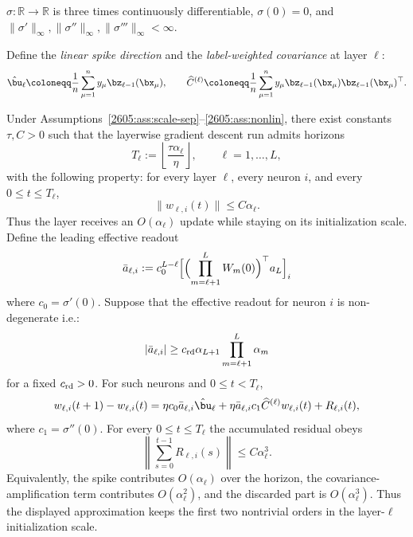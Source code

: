 \begin{assumption}\label{2605:ass:nonlin}
$\sigma:\mathbb{R}\to\mathbb{R}$ is three times continuously differentiable,
$\sigma(0)=0$, and $\|\sigma'\|_\infty,\|\sigma''\|_\infty,\|\sigma'''\|_\infty<\infty$.
\end{assumption}

Define the \emph{linear spike direction} and the \emph{label-weighted covariance} at layer $\ell$:
\begin{equation}\label{2605:eq:sec2-linear-component}
\hat{\bu}_\ell
\coloneqq \frac{1}{n}\sum_{\mu=1}^n y_\mu \bz_{\ell-1}(\bx_\mu),
\qquad
\widehat{C}^{(\ell)}
\coloneqq \frac{1}{n}\sum_{\mu=1}^n
y_\mu \bz_{\ell-1}(\bx_\mu)\bz_{\ell-1}(\bx_\mu)^\top.
\end{equation}

\begin{theorem}\label{2605:thm:neural-lofi}
Under Assumptions~\ref{2605:ass:scale-sep}--\ref{2605:ass:nonlin}, there exist constants
$\tau,C>0$ such that the layerwise gradient descent run admits
horizons
\begin{equation}\label{2605:eq:layerwise-horizons}
T_\ell:=\left\lfloor \frac{\tau\alpha_\ell}{\eta}\right\rfloor,
\qquad \ell=1,\dots,L,
\end{equation}
with the following property: for every layer $\ell$, every neuron $i$, and every
$0\le t\le T_\ell$,
\[
\|w_{\ell,i}(t)\|\le C\alpha_\ell.
\]
Thus the layer receives an $O(\alpha_\ell)$ update while staying on its
initialization scale.  Define the leading effective readout
\begin{equation}\label{2605:eq:effective-readout-fc}
\bar{a}_{\ell,i}
:= c_0^{L-\ell}\Bigl[\Bigl(\prod_{m=\ell+1}^{L}W_m(0)\Bigr)^\top a_L\Bigr]_i
\end{equation}
where \(c_0=\sigma'(0)\). Suppose that the effective readout for neuron $i$ is non-degenerate i.e.:
\begin{equation}\label{2605:eq:readout-nondegenerate}
    |\bar a_{\ell,i}|\ge c_{\rm rd} \alpha_{L+1}\prod_{m=\ell+1}^{L}\alpha_m
\end{equation}
for a fixed \(c_{\rm rd}>0\). For such neurons and \(0\le t<T_\ell\),
\begin{equation}\label{2605:eq:sec2-main-dynamics}
w_{\ell,i}(t+1) - w_{\ell,i}(t)
= \eta c_0 \bar{a}_{\ell,i} \hat{\bu}_\ell
+ \eta \bar{a}_{\ell,i} c_1 \widehat{C}^{(\ell)} w_{\ell,i}(t)
+ R_{\ell,i}(t),
\end{equation}
where \(c_1=\sigma''(0)\). For every \(0\le t\le T_\ell\) the accumulated residual obeys
\begin{equation}\label{2605:eq:remainder-bound}
    \left\|
        \sum_{s=0}^{t-1}R_{\ell,i}(s)
    \right\|
    \le
    C\alpha_\ell^3 .
\end{equation}
Equivalently, the spike contributes \(O(\alpha_\ell)\) over the horizon, the
covariance-amplification term contributes \(O(\alpha_\ell^2)\), and the
discarded part is \(O(\alpha_\ell^3)\). Thus the displayed approximation keeps
the first two nontrivial orders in the layer-\(\ell\) initialization scale.
\end{theorem}

